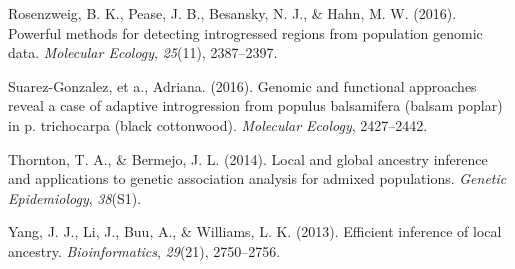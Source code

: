 \documentclass[12pt,twoside]{reedthesis}
\begin{document}
  \hypertarget{ref-rosenzweig2016powerful}{}
  Rosenzweig, B. K., Pease, J. B., Besansky, N. J., \& Hahn, M. W. (2016).
  Powerful methods for detecting introgressed regions from population
  genomic data. \emph{Molecular Ecology}, \emph{25}(11), 2387--2397.
  
  \hypertarget{ref-suarez2016}{}
  Suarez-Gonzalez, et a., Adriana. (2016). Genomic and functional
  approaches reveal a case of adaptive introgression from populus
  balsamifera (balsam poplar) in p. trichocarpa (black cottonwood).
  \emph{Molecular Ecology}, 2427--2442.
  
  \hypertarget{ref-thornton2014local}{}
  Thornton, T. A., \& Bermejo, J. L. (2014). Local and global ancestry
  inference and applications to genetic association analysis for admixed
  populations. \emph{Genetic Epidemiology}, \emph{38}(S1).
  
  \hypertarget{ref-yang2013efficient}{}
  Yang, J. J., Li, J., Buu, A., \& Williams, L. K. (2013). Efficient
  inference of local ancestry. \emph{Bioinformatics}, \emph{29}(21),
  2750--2756.
  
\end{document}
